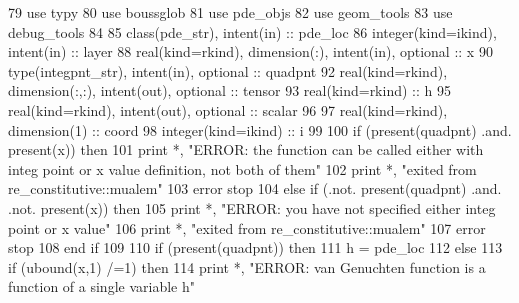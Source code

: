 \begin{DoxyCode}
79         \textcolor{keywordtype}{use }typy
80         \textcolor{keywordtype}{use }boussglob
81         \textcolor{keywordtype}{use }pde_objs
82         \textcolor{keywordtype}{use }geom_tools
83         \textcolor{keywordtype}{use }debug_tools
84 
85         \textcolor{keywordtype}{class}(pde_str), \textcolor{keywordtype}{intent(in)} :: pde\_loc
86         \textcolor{keywordtype}{integer(kind=ikind)}, \textcolor{keywordtype}{intent(in)} :: layer
88         \textcolor{keywordtype}{real(kind=rkind)}, \textcolor{keywordtype}{dimension(:)}, \textcolor{keywordtype}{intent(in)}, \textcolor{keywordtype}{optional} :: x
90         \textcolor{keywordtype}{type}(integpnt_str), \textcolor{keywordtype}{intent(in)}, \textcolor{keywordtype}{optional} :: quadpnt      
92         \textcolor{keywordtype}{real(kind=rkind)}, \textcolor{keywordtype}{dimension(:,:)}, \textcolor{keywordtype}{intent(out)}, \textcolor{keywordtype}{optional} :: tensor
93         \textcolor{keywordtype}{real(kind=rkind)} :: h
95         \textcolor{keywordtype}{real(kind=rkind)}, \textcolor{keywordtype}{intent(out)}, \textcolor{keywordtype}{optional} :: scalar
96 
97         \textcolor{keywordtype}{real(kind=rkind)}, \textcolor{keywordtype}{dimension(1)} :: coord
98         \textcolor{keywordtype}{integer(kind=ikind)} :: i
99 
100         \textcolor{keywordflow}{if} (\textcolor{keyword}{present}(quadpnt) .and. \textcolor{keyword}{present}(x)) \textcolor{keywordflow}{then}
101           print *, \textcolor{stringliteral}{"ERROR: the function can be called either with integ point or x value definition, not
       both of them"}
102           print *, \textcolor{stringliteral}{"exited from re\_constitutive::mualem"}
103           error stop
104         \textcolor{keywordflow}{else} \textcolor{keywordflow}{if} (.not. \textcolor{keyword}{present}(quadpnt) .and. .not. \textcolor{keyword}{present}(x)) \textcolor{keywordflow}{then}
105           print *, \textcolor{stringliteral}{"ERROR: you have not specified either integ point or x value"}
106           print *, \textcolor{stringliteral}{"exited from re\_constitutive::mualem"}
107           error stop
108 \textcolor{keywordflow}{        end if}
109         
110         \textcolor{keywordflow}{if} (\textcolor{keyword}{present}(quadpnt)) \textcolor{keywordflow}{then}
111           h = pde\_loc%
112         \textcolor{keywordflow}{else}
113           \textcolor{keywordflow}{if} (ubound(x,1) /=1) \textcolor{keywordflow}{then}
114             print *, \textcolor{stringliteral}{"ERROR: van Genuchten function is a function of a single variable h"}

\end{DoxyCode}
